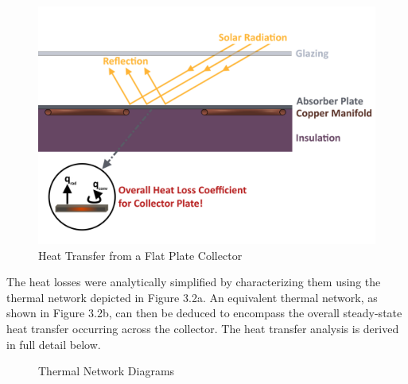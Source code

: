 \medskip
\begin{figure}[H]
    \centering
    \includegraphics[width=\textwidth]{images/flat_plate_heat_transfer.png}
    \caption{Heat Transfer from a Flat Plate Collector}
\end{figure}

\medskip
The heat losses were analytically simplified by characterizing them using the thermal network depicted in Figure 3.2a. An equivalent thermal network, as shown in Figure 3.2b, can then be deduced to encompass the overall steady-state heat transfer occurring across the collector. The heat transfer analysis is derived in full detail below.

\smallskip
\begin{figure}[H]
    \centering
    \qquad
    \caption{Thermal Network Diagrams}
\end{figure}

